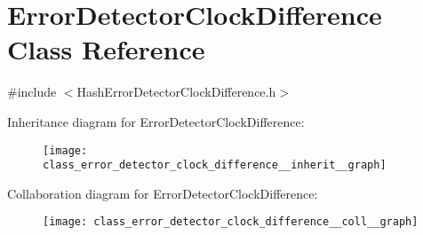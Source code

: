 \hypertarget{class_error_detector_clock_difference}{}\section{Error\+Detector\+Clock\+Difference Class Reference}
\label{class_error_detector_clock_difference}


{\ttfamily \#include $<$Hash\+Error\+Detector\+Clock\+Difference.\+h$>$}



Inheritance diagram for Error\+Detector\+Clock\+Difference\+:\nopagebreak
\begin{figure}[H]
\begin{center}
\leavevmode
\texttt{[image: class\_error\_detector\_clock\_difference\_\_inherit\_\_graph]}
\end{center}
\end{figure}


Collaboration diagram for Error\+Detector\+Clock\+Difference\+:\nopagebreak
\begin{figure}[H]
\begin{center}
\leavevmode
\texttt{[image: class\_error\_detector\_clock\_difference\_\_coll\_\_graph]}
\end{center}
\end{figure}
